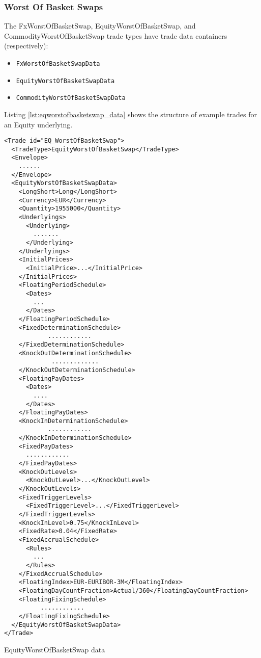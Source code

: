 \subsubsection{Worst Of Basket Swaps}

The FxWorstOfBasketSwap, EquityWorstOfBasketSwap, and CommodityWorstOfBasketSwap trade types
have trade data containers (respectively):
\begin{itemize}
  \item \lstinline!FxWorstOfBasketSwapData!
  \item \lstinline!EquityWorstOfBasketSwapData!
  \item \lstinline!CommodityWorstOfBasketSwapData!
\end{itemize}
Listing \ref{lst:eqworstofbasketswap_data} shows the structure of example trades for an Equity underlying.

\begin{listing}[H]
\begin{verbatim}
<Trade id="EQ_WorstOfBasketSwap">
  <TradeType>EquityWorstOfBasketSwap</TradeType>
  <Envelope>
    ......
  </Envelope>
  <EquityWorstOfBasketSwapData>
    <LongShort>Long</LongShort>
    <Currency>EUR</Currency>
    <Quantity>1955000</Quantity>
    <Underlyings>
      <Underlying>
        .......
      </Underlying>
    </Underlyings>
    <InitialPrices>
      <InitialPrice>...</InitialPrice>
    </InitialPrices>
    <FloatingPeriodSchedule>
      <Dates>
        ...
      </Dates>
    </FloatingPeriodSchedule>
    <FixedDeterminationSchedule>
            ............
    </FixedDeterminationSchedule>
    <KnockOutDeterminationSchedule>
             .............
    </KnockOutDeterminationSchedule>
    <FloatingPayDates>
      <Dates>
        ....
      </Dates>
    </FloatingPayDates>
    <KnockInDeterminationSchedule>
            ............
    </KnockInDeterminationSchedule>
    <FixedPayDates>
      ............
    </FixedPayDates>
    <KnockOutLevels>
      <KnockOutLevel>...</KnockOutLevel>
    </KnockOutLevels>
    <FixedTriggerLevels>
      <FixedTriggerLevel>...</FixedTriggerLevel>
    </FixedTriggerLevels>
    <KnockInLevel>0.75</KnockInLevel>
    <FixedRate>0.04</FixedRate>
    <FixedAccrualSchedule>
      <Rules>
        ...
      </Rules>
    </FixedAccrualSchedule>
    <FloatingIndex>EUR-EURIBOR-3M</FloatingIndex>
    <FloatingDayCountFraction>Actual/360</FloatingDayCountFraction>
    <FloatingFixingSchedule>
          ............
    </FloatingFixingSchedule>
  </EquityWorstOfBasketSwapData>
</Trade>
\end{verbatim}
\caption{EquityWorstOfBasketSwap data}
\label{lst:eqworstofbasketswap_data}
\end{listing}

